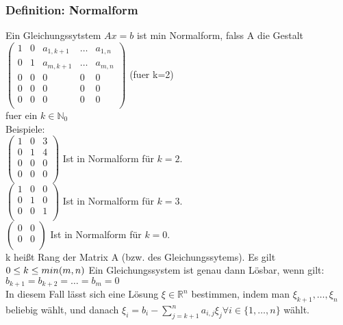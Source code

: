 \documentclass{scrartcl}
\newcommand{\N}{\mathbb{N}}
\newcommand{\Rn}{\mathbb{R}^n}
\begin{document}
\subsubsection{Definition: Normalform}
Ein Gleichungssytstem \(Ax=b\) ist min Normalform, falss A die Gestalt \\
\(
\begin{pmatrix}
1 & 0 & a_{1,k+1}& \dots & a_{1, n}\\
0 & 1 & a_{m, k+1} & \dots & a_{m, n}\\
0 & 0 & 0 & 0 & 0\\
0 & 0 & 0 & 0 & 0\\
0 & 0 & 0 & 0 & 0\\
\end{pmatrix}
\) (fuer k=2)\\
fuer ein \(k \in \N_0\)\\
Beispiele:\\
\(
\begin{pmatrix}
1 & 0 & 3\\
0 & 1 & 4\\
0 & 0 & 0\\
0 & 0 & 0\\
\end{pmatrix}
\) Ist in Normalform f\"ur \(k = 2\).\\
\(
\begin{pmatrix}
1 & 0 & 0\\
0 & 1 & 0\\
0 & 0 & 1\\
\end{pmatrix}
\) Ist in Normalform f\"ur \(k = 3\).\\
\(
\begin{pmatrix}
0 & 0\\
0 & 0\\
\end{pmatrix}
\) Ist in Normalform f\"ur \(k = 0\).\\
k hei\ss{}t Rang der Matrix A (bzw. des Gleichungssytems). Es gilt \\
\(0 \le k \le min(m, n)\\ \)
Ein Gleichungssystem ist genau dann L\"osbar,  wenn gilt:\\
\(
b_{k+1} = b_{k+2} = \dots = b_m = 0
\)\\
In diesem Fall l\"asst sich eine L\"osung \(\xi \in \Rn\) bestimmen,  indem man \(\xi_{k+1}, \dots, \xi_n\) beliebig w\"ahlt, und danach \(\xi_i = b_i -  \sum_{j=k+1}^n a_{i,j} \xi_j \forall i\in\{1,\dots,n\}\) w\"ahlt.\\
\end{document}
